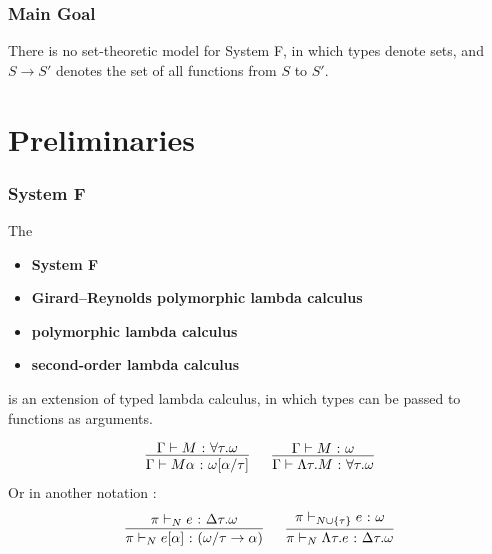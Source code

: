 \begin{frame}[t,plain]
\titlepage
\end{frame}

\renewcommand{\colon}{\mbox{~:~}}

\begin{frame}[fragile]
    \frametitle{Main Goal}
  
    There is no set-theoretic model for System F, in which types denote sets, and $S \rightarrow S'$ denotes the set of all functions from $S$ to $S'$.
\end{frame}

\section{Preliminaries}

\begin{frame}[fragile]
    \frametitle{System F}
  
    The
    \begin{itemize}
        \item \textbf{System F}
        \item \textbf{Girard--Reynolds polymorphic lambda calculus}
        \item \textbf{polymorphic lambda calculus}
        \item \textbf{second-order lambda calculus}
    \end{itemize}
    is an extension of typed lambda calculus, in which types can be passed to functions as arguments.
  
    $$
    \begin{matrix}
    \infer{\Gamma \vdash M\alpha \colon \omega[\alpha/\tau]}{\Gamma \vdash M \colon \forall\tau.\omega}
    \ &\ 
    \infer{\Gamma \vdash \Lambda\tau. M \colon \forall\tau.\omega}{\Gamma \vdash M \colon \omega}
    \end{matrix}
    $$
    \pause
    Or in another notation \cite{REYNOLDS19931}:
    $$
    \begin{matrix}
    \infer{\pi \vdash_N e[\alpha] \colon (\omega / \tau \rightarrow \alpha)}{\pi \vdash_N e \colon \Delta\tau.\omega}
    \ &\ 
    \infer{\pi \vdash_N \Lambda\tau. e \colon \Delta\tau.\omega}{\pi \vdash_{N \cup \{\tau\}} e \colon \omega}
    \end{matrix}
    $$
\end{frame}

